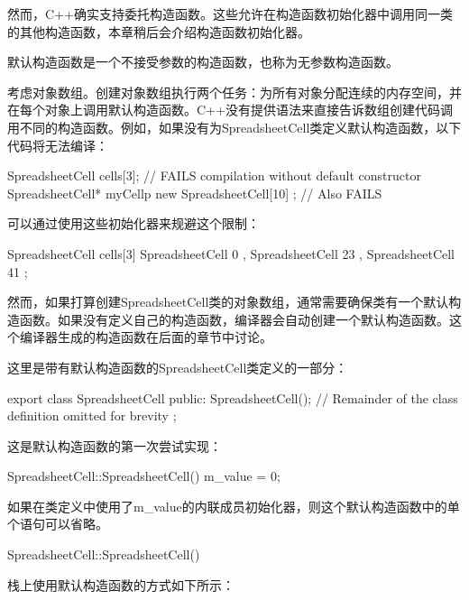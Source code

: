 然而，C++确实支持委托构造函数。这些允许在构造函数初始化器中调用同一类的其他构造函数，本章稍后会介绍构造函数初始化器。


默认构造函数是一个不接受参数的构造函数，也称为无参数构造函数。


考虑对象数组。创建对象数组执行两个任务：为所有对象分配连续的内存空间，并在每个对象上调用默认构造函数。C++没有提供语法来直接告诉数组创建代码调用不同的构造函数。例如，如果没有为SpreadsheetCell类定义默认构造函数，以下代码将无法编译：

\begin{cpp}
SpreadsheetCell cells[3]; // FAILS compilation without default constructor
SpreadsheetCell* myCellp { new SpreadsheetCell[10] }; // Also FAILS
\end{cpp}

可以通过使用这些初始化器来规避这个限制：

\begin{cpp}
SpreadsheetCell cells[3] { SpreadsheetCell { 0 }, SpreadsheetCell { 23 },
    SpreadsheetCell { 41 } };
\end{cpp}

然而，如果打算创建SpreadsheetCell类的对象数组，通常需要确保类有一个默认构造函数。如果没有定义自己的构造函数，编译器会自动创建一个默认构造函数。这个编译器生成的构造函数在后面的章节中讨论。


这里是带有默认构造函数的SpreadsheetCell类定义的一部分：

\begin{cpp}
export class SpreadsheetCell
{
    public:
        SpreadsheetCell();
        // Remainder of the class definition omitted for brevity
};
\end{cpp}

这是默认构造函数的第一次尝试实现：

\begin{cpp}
SpreadsheetCell::SpreadsheetCell()
{
    m_value = 0;
}
\end{cpp}

如果在类定义中使用了m\_value的内联成员初始化器，则这个默认构造函数中的单个语句可以省略。

\begin{cpp}
SpreadsheetCell::SpreadsheetCell()
{}
\end{cpp}

栈上使用默认构造函数的方式如下所示：

